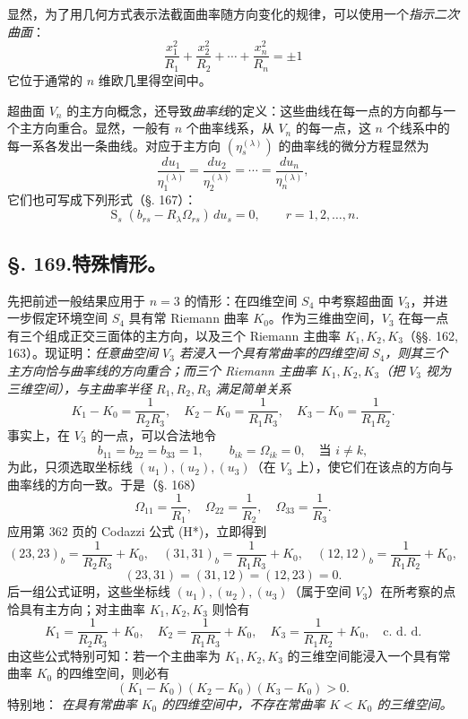 显然，为了用几何方式表示法截面曲率随方向变化的规律，可以使用一个\emph{指示二次曲面}：
\[
 \frac{x_1^2}{R_1}+\frac{x_2^2}{R_2}+\cdots+\frac{x_n^2}{R_n}=\pm1
\]
它位于通常的 \(n\) 维欧几里得空间中。

超曲面 \(V_n\) 的主方向概念，还导致\emph{曲率线}的定义：这些曲线在每一点的方向都与一个主方向重合。显然，一般有 \(n\) 个曲率线系，从 \(V_n\) 的每一点，这 \(n\) 个线系中的每一系各发出一条曲线。对应于主方向 \((\eta_s^{(\lambda)})\) 的曲率线的微分方程显然为
\[
 \frac{du_1}{\eta_1^{(\lambda)}}=\frac{du_2}{\eta_2^{(\lambda)}}=\cdots=\frac{du_n}{\eta_n^{(\lambda)}},
\]
它们也可写成下列形式（\S. 167）：
\[
 \mathop{\mathrm{S}}_s(b_{rs}-R_\lambda\Omega_{rs})\,du_s=0,\qquad r=1,2,\ldots,n.
\]

\subsection*{\S. 169.\quad 特殊情形。}

先把前述一般结果应用于 \(n=3\) 的情形：在四维空间 \(S_4\) 中考察超曲面 \(V_3\)，并进一步假定环境空间 \(S_4\) 具有常 Riemann 曲率 \(K_0\)。作为三维曲空间，\(V_3\) 在每一点有三个组成正交三面体的主方向，以及三个 Riemann 主曲率 \(K_1,K_2,K_3\)（\S\S. 162, 163）。现证明：\emph{任意曲空间 \(V_3\) 若浸入一个具有常曲率的四维空间 \(S_4\)，则其三个主方向恰与曲率线的方向重合；而三个 Riemann 主曲率 \(K_1,K_2,K_3\)（把 \(V_3\) 视为三维空间），与主曲率半径 \(R_1,R_2,R_3\) 满足简单关系}
\[
 K_1-K_0=\frac1{R_2R_3},\quad K_2-K_0=\frac1{R_1R_3},\quad K_3-K_0=\frac1{R_1R_2}.
\]
事实上，在 \(V_3\) 的一点，可以合法地令
\[
 b_{11}=b_{22}=b_{33}=1,\qquad b_{ik}=\Omega_{ik}=0,\quad \text{当 }i\ne k,
\]
为此，只须选取坐标线 \((u_1),(u_2),(u_3)\)（在 \(V_3\) 上），使它们在该点的方向与曲率线的方向一致。于是（\S. 168）
\[
 \Omega_{11}=\frac1{R_1},\quad \Omega_{22}=\frac1{R_2},\quad \Omega_{33}=\frac1{R_3}.
\]
应用第 362 页的 Codazzi 公式 (H*)，立即得到
\[
 (23,23)_b=\frac1{R_2R_3}+K_0,\quad
 (31,31)_b=\frac1{R_1R_3}+K_0,\quad
 (12,12)_b=\frac1{R_1R_2}+K_0,
\]
\[
 (23,31)=(31,12)=(12,23)=0.
\]
后一组公式证明，这些坐标线 \((u_1),(u_2),(u_3)\)（属于空间 \(V_3\)）在所考察的点恰具有主方向；对主曲率 \(K_1,K_2,K_3\) 则恰有
\[
 K_1=\frac1{R_2R_3}+K_0,\quad
 K_2=\frac1{R_1R_3}+K_0,\quad
 K_3=\frac1{R_1R_2}+K_0,\quad \text{c. d. d.}
\]
由这些公式特别可知：若一个主曲率为 \(K_1,K_2,K_3\) 的三维空间能浸入一个具有常曲率 \(K_0\) 的四维空间，则必有
\[
 (K_1-K_0)(K_2-K_0)(K_3-K_0)>0.
\]
特别地：
\emph{在具有常曲率 \(K_0\) 的四维空间中，不存在常曲率 \(K<K_0\) 的三维空间。}

